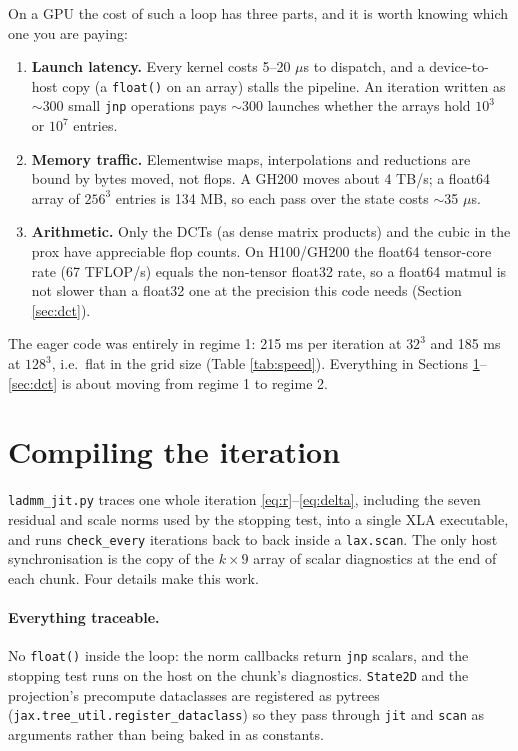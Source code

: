 \documentclass[11pt]{article}
\newcommand{\code}[1]{\texttt{#1}}
\begin{document}
On a GPU the cost of such a loop has three parts, and it is worth knowing which one you
are paying:
\begin{enumerate}
  \item \textbf{Launch latency.} Every kernel costs 5--20 $\mu$s to dispatch, and a
  device-to-host copy (a \code{float()} on an array) stalls the pipeline. An iteration
  written as $\sim$300 small \code{jnp} operations pays $\sim$300 launches whether the
  arrays hold $10^3$ or $10^7$ entries.
  \item \textbf{Memory traffic.} Elementwise maps, interpolations and reductions are
  bound by bytes moved, not flops. A GH200 moves about 4 TB/s; a float64 array of
  $256^3$ entries is 134 MB, so each pass over the state costs $\sim$35 $\mu$s.
  \item \textbf{Arithmetic.} Only the DCTs (as dense matrix products) and the cubic in
  the prox have appreciable flop counts. On H100/GH200 the float64 tensor-core rate
  (67 TFLOP/s) equals the non-tensor float32 rate, so a float64 matmul is not slower
  than a float32 one at the precision this code needs (Section \ref{sec:dct}).
\end{enumerate}
The eager code was entirely in regime 1: 215 ms per iteration at $32^3$ and 185 ms at
$128^3$, i.e.\ flat in the grid size (Table \ref{tab:speed}). Everything in Sections
\ref{sec:jit}--\ref{sec:dct} is about moving from regime 1 to regime 2.

\section{Compiling the iteration}\label{sec:jit}

\code{ladmm\_jit.py} traces one whole iteration \eqref{eq:r}--\eqref{eq:delta}, including
the seven residual and scale norms used by the stopping test, into a single XLA
executable, and runs \code{check\_every} iterations back to back inside a
\code{lax.scan}. The only host synchronisation is the copy of the $k\times 9$ array of
scalar diagnostics at the end of each chunk. Four details make this work.

\paragraph{Everything traceable.} No \code{float()} inside the loop: the norm callbacks
return \code{jnp} scalars, and the stopping test runs on the host on the chunk's
diagnostics. \code{State2D} and the projection's precompute dataclasses are registered as
pytrees (\code{jax.tree\_util.register\_dataclass}) so they pass through \code{jit} and
\code{scan} as arguments rather than being baked in as constants.
\end{document}

